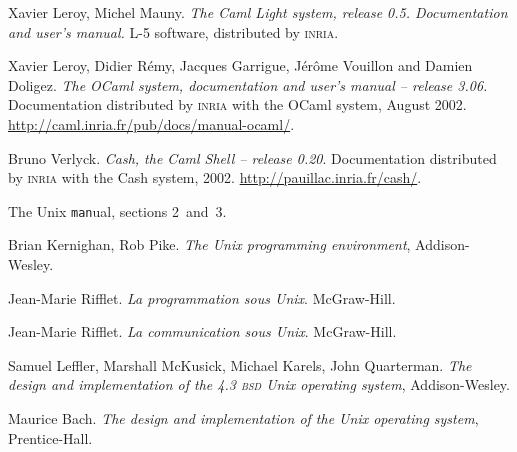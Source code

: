 %
%

\renewcommand{\bibname}{References}
\begin{thebibliography}{9}


Xavier Leroy, Michel Mauny. \emph{The Caml Light system, release 0.5.
Documentation and user's manual.} L-5 software, distributed by \textsc{inria}.

Xavier Leroy, Didier Rémy, Jacques Garrigue, Jérôme Vouillon and
Damien Doligez.
\emph{The {OCaml} system,
documentation and user's manual -- release 3.06.}
Documentation distributed by \textsc{inria} with the OCaml
system, August 2002.
\url{http://caml.inria.fr/pub/docs/manual-ocaml/}.

Bruno Verlyck.
\emph{Cash, the Caml Shell -- release 0.20}.
Documentation distributed by \textsc{inria} with the Cash system, 2002. 
\url{http://pauillac.inria.fr/cash/}.


The Unix \texttt{man}ual, sections 2~and~3.

Brian Kernighan, Rob Pike. \emph{The Unix programming
environment}, Addison-Wesley.

Jean-Marie Rifflet. \emph{La programmation sous Unix}. McGraw-Hill.

Jean-Marie Rifflet. \emph{La communication sous Unix}. McGraw-Hill.


Samuel Leffler, Marshall McKusick, Michael Karels, John Quarterman.
\emph{The design and implementation of the 4.3 \textsc{bsd}
 Unix operating system},
Addison-Wesley.

Maurice Bach. \emph{The design and implementation of the Unix operating
system}, Prentice-Hall.


\end{thebibliography}

